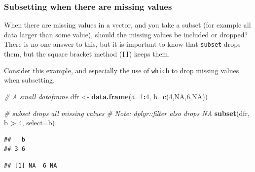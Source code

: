 \documentclass[]{book}
\newenvironment{Shaded}{\begin{snugshade}}{\end{snugshade}}
\newcommand{\CommentTok}[1]{\textcolor[rgb]{0.56,0.35,0.01}{\textit{#1}}}
\newcommand{\DataTypeTok}[1]{\textcolor[rgb]{0.13,0.29,0.53}{#1}}
\newcommand{\DecValTok}[1]{\textcolor[rgb]{0.00,0.00,0.81}{#1}}
\newcommand{\KeywordTok}[1]{\textcolor[rgb]{0.13,0.29,0.53}{\textbf{#1}}}
\newcommand{\NormalTok}[1]{#1}
\newcommand{\OperatorTok}[1]{\textcolor[rgb]{0.81,0.36,0.00}{\textbf{#1}}}
\newcommand{\OtherTok}[1]{\textcolor[rgb]{0.56,0.35,0.01}{#1}}
\newcommand{\StringTok}[1]{\textcolor[rgb]{0.31,0.60,0.02}{#1}}
\begin{document}
\hypertarget{subsetmissing}{%
\subsubsection{Subsetting when there are missing values}\label{subsetmissing}}

When there are missing values in a vector, and you take a subset (for example all data larger than some value), should the missing values be included or dropped? There is no one answer to this, but it is important to know that \texttt{subset} drops them, but the square bracket method (\texttt{{[}{]}}) keeps them.

Consider this example, and especially the use of \texttt{which} to drop missing values when subsetting.

\begin{Shaded}
\begin{Highlighting}[]
\CommentTok{# A small dataframe}
\NormalTok{dfr <-}\StringTok{ }\KeywordTok{data.frame}\NormalTok{(}\DataTypeTok{a=}\DecValTok{1}\OperatorTok{:}\DecValTok{4}\NormalTok{, }\DataTypeTok{b=}\KeywordTok{c}\NormalTok{(}\DecValTok{4}\NormalTok{,}\OtherTok{NA}\NormalTok{,}\DecValTok{6}\NormalTok{,}\OtherTok{NA}\NormalTok{))}

\CommentTok{# subset drops all missing values}
\CommentTok{# Note: dplyr::filter also drops NA}
\KeywordTok{subset}\NormalTok{(dfr, b }\OperatorTok{>}\StringTok{ }\DecValTok{4}\NormalTok{, }\DataTypeTok{select=}\NormalTok{b)}
\end{Highlighting}
\end{Shaded}

\begin{verbatim}
##   b
## 3 6
\end{verbatim}

\begin{Shaded}
\end{Shaded}

\begin{verbatim}
## [1] NA  6 NA
\end{verbatim}

\begin{Shaded}
\end{Shaded}
\end{document}
